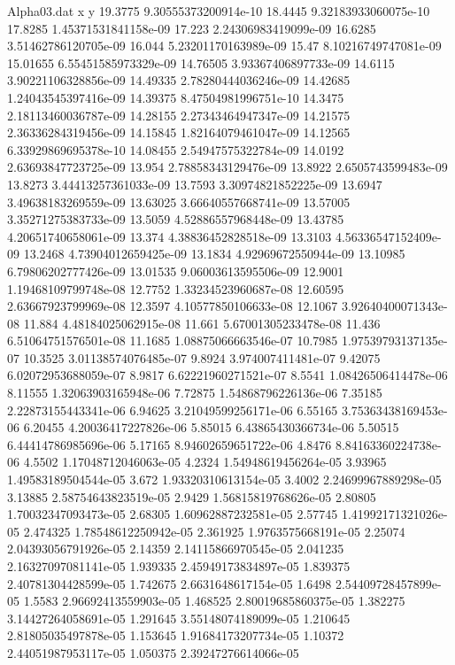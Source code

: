\begin{filecontents}{Alpha03.dat}
x y
19.3775	9.30555373200914e-10
18.4445	9.32183933060075e-10
17.8285	1.45371531841158e-09
17.223	2.24306983419099e-09
16.6285	3.51462786120705e-09
16.044	5.23201170163989e-09
15.47	8.10216749747081e-09
15.01655	6.55451585973329e-09
14.76505	3.93367406897733e-09
14.6115	3.90221106328856e-09
14.49335	2.78280444036246e-09
14.42685	1.24043545397416e-09
14.39375	8.47504981996751e-10
14.3475	2.18113460036787e-09
14.28155	2.27343464947347e-09
14.21575	2.36336284319456e-09
14.15845	1.82164079461047e-09
14.12565	6.33929869695378e-10
14.08455	2.54947575322784e-09
14.0192	2.63693847723725e-09
13.954	2.78858343129476e-09
13.8922	2.6505743599483e-09
13.8273	3.44413257361033e-09
13.7593	3.30974821852225e-09
13.6947	3.49638183269559e-09
13.63025	3.66640557668741e-09
13.57005	3.35271275383733e-09
13.5059	4.52886557968448e-09
13.43785	4.20651740658061e-09
13.374	4.38836452828518e-09
13.3103	4.56336547152409e-09
13.2468	4.73904012659425e-09
13.1834	4.92969672550944e-09
13.10985	6.79806202777426e-09
13.01535	9.06003613595506e-09
12.9001	1.19468109799748e-08
12.7752	1.33234523960687e-08
12.60595	2.63667923799969e-08
12.3597	4.10577850106633e-08
12.1067	3.92640400071343e-08
11.884	4.48184025062915e-08
11.661	5.67001305233478e-08
11.436	6.51064751576501e-08
11.1685	1.08875066663546e-07
10.7985	1.97539793137135e-07
10.3525	3.01138574076485e-07
9.8924	3.974007411481e-07
9.42075	6.02072953688059e-07
8.9817	6.62221960271521e-07
8.5541	1.08426506414478e-06
8.11555	1.32063903165948e-06
7.72875	1.54868796226136e-06
7.35185	2.22873155443341e-06
6.94625	3.21049599256171e-06
6.55165	3.75363438169453e-06
6.20455	4.20036417227826e-06
5.85015	6.43865430366734e-06
5.50515	6.44414786985696e-06
5.17165	8.94602659651722e-06
4.8476	8.84163360224738e-06
4.5502	1.17048712046063e-05
4.2324	1.54948619456264e-05
3.93965	1.49583189504544e-05
3.672	1.93320310613154e-05
3.4002	2.24699967889298e-05
3.13885	2.58754643823519e-05
2.9429	1.56815819768626e-05
2.80805	1.70032347093473e-05
2.68305	1.60962887232581e-05
2.57745	1.41992171321026e-05
2.474325	1.78548612250942e-05
2.361925	1.9763575668191e-05
2.25074	2.04393056791926e-05
2.14359	2.14115866970545e-05
2.041235	2.16327097081141e-05
1.939335	2.45949173834897e-05
1.839375	2.40781304428599e-05
1.742675	2.6631648617154e-05
1.6498	2.54409728457899e-05
1.5583	2.96692413559903e-05
1.468525	2.80019685860375e-05
1.382275	3.14427264058691e-05
1.291645	3.55148074189099e-05
1.210645	2.81805035497878e-05
1.153645	1.91684173207734e-05
1.10372	2.44051987953117e-05
1.050375	2.39247276614066e-05

\end{filecontents}
